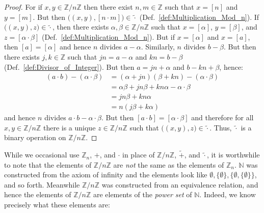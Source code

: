     \begin{proof}
        For if $x,y\in\mathbb{Z}/n\mathbb{Z}$ then there exist
        $n,m\in\mathbb{Z}$ such that $x=[n]$ and $y=[m]$. But then
        $\big((x,y),[n\cdot{m}]\big)\in\tilde{\cdot}$
        (Def.~\ref{def:Multiplication_Mod_n}). If
        $\big((x,y),z\big)\in\tilde{\cdot}$, then there exists
        $\alpha,\beta\in\mathbb{Z}/n\mathbb{Z}$ such that
        $x=[\alpha]$, $y=[\beta]$, and $z=[\alpha\cdot\beta]$
        (Def.~\ref{def:Multiplication_Mod_n}). But if $x=[\alpha]$ and
        $x=[a]$, then $[a]=[\alpha]$ and hence $n$ divides $a-\alpha$.
        Similarly, $n$ divides $b-\beta$. But then there exists
        $j,k\in\mathbb{Z}$ such that $jn=a-\alpha$ and $kn=b-\beta$
        (Def.~\ref{def:Divisor_of_Integer}). But then
        $a=jn+\alpha$ and $b-kn+\beta$, hence:
        \begin{subequations}
            \begin{align}
                (a\cdot{b})-(\alpha\cdot\beta)
                    &=(\alpha+jn)(\beta+kn)-(\alpha\cdot\beta)\\
                    &=\alpha\beta+jn\beta+kn\alpha-\alpha\cdot\beta\\
                    &=jn\beta+kn\alpha\\
                    &=n(j\beta+k\alpha)
            \end{align}
        \end{subequations}
        and hence $n$ divides $a\cdot{b}-\alpha\cdot\beta$. But then
        $[a\cdot{b}]=[\alpha\cdot\beta]$ and therefore for all
        $x,y\in\mathbb{Z}/n\mathbb{Z}$ there is a unique
        $z\in\mathbb{Z}/n\mathbb{Z}$ such that
        $\big((x,y),z\big)\in\tilde{\cdot}$. Thus, $\tilde{\cdot}$ is a
        binary operation on $\mathbb{Z}/n\mathbb{Z}$.
    \end{proof}
    While we occasional use $\mathbb{Z}_{n}$, $+$, and $\cdot$ in place
    of $\mathbb{Z}/n\mathbb{Z}$, $\tilde{+}$, and $\tilde{\cdot}$, it is
    worthwhile to note that the elements of $\mathbb{Z}/n\mathbb{Z}$ are
    \textit{not} the same as the elements of $\mathbb{Z}_{n}$.
    $\mathbb{N}$ was constructed from the axiom of infinity and the
    elements look like
    $\emptyset,\{\emptyset\},\{\emptyset,\{\emptyset\}\}$, and so forth.
    Meanwhile $\mathbb{Z}/n\mathbb{Z}$ was constructed from an
    equivalence relation, and hence the elements of
    $\mathbb{Z}/n\mathbb{Z}$ are elements of the \textit{power set} of
    $\mathbb{N}$. Indeed, we know precisely what these elements are:
